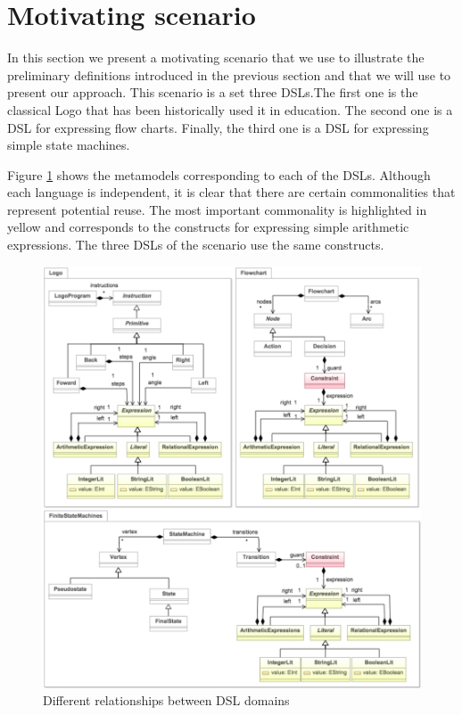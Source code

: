 \section{Motivating scenario}
\label{sec:moticatingscenario}

In this section we present a motivating scenario that we use to illustrate the preliminary definitions introduced in the previous section and that we will use to present our approach. This scenario is a set three DSLs.The first one is the classical Logo that has been historically used it in education. The second one is a DSL for expressing flow charts. Finally, the third one is a DSL for expressing simple state machines.

Figure \ref{fig:motivating-example} shows the metamodels corresponding to each of the DSLs. Although each language is independent, it is clear that there are certain commonalities that represent potential reuse. The most important commonality is highlighted in yellow and corresponds to the constructs for expressing simple arithmetic expressions. The three DSLs of the scenario use the same constructs. 

\begin{figure}
\centering
\includegraphics[width=1.05\linewidth]{images/motivating-example.pdf}
\caption{Different relationships between DSL domains}
\label{fig:motivating-example}
\end{figure}